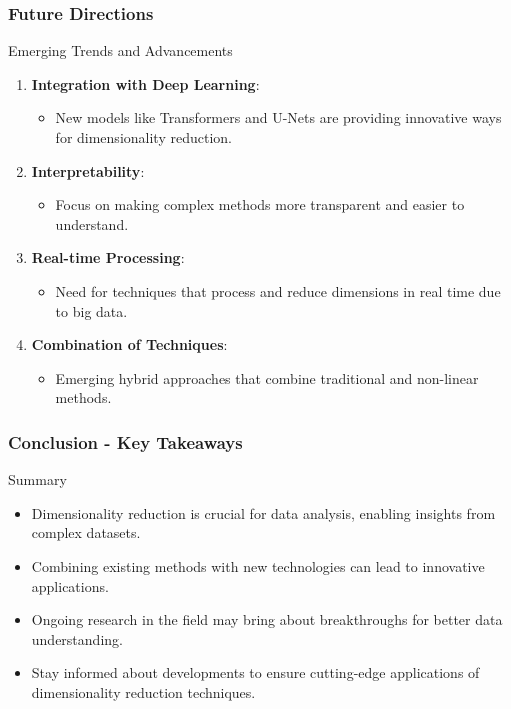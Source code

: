 \documentclass[aspectratio=169]{beamer}
\begin{document}
\begin{frame}[fragile]
    \frametitle{Future Directions}
    \begin{block}{Emerging Trends and Advancements}
        \begin{enumerate}
            \item \textbf{Integration with Deep Learning}:
                \begin{itemize}
                    \item New models like Transformers and U-Nets are providing innovative ways for dimensionality reduction.
                \end{itemize}
            \item \textbf{Interpretability}:
                \begin{itemize}
                    \item Focus on making complex methods more transparent and easier to understand.
                \end{itemize}
            \item \textbf{Real-time Processing}:
                \begin{itemize}
                    \item Need for techniques that process and reduce dimensions in real time due to big data.
                \end{itemize}
            \item \textbf{Combination of Techniques}:
                \begin{itemize}
                    \item Emerging hybrid approaches that combine traditional and non-linear methods.
                \end{itemize}
        \end{enumerate}
    \end{block}
\end{frame}

\begin{frame}[fragile]
    \frametitle{Conclusion - Key Takeaways}
    \begin{block}{Summary}
        \begin{itemize}
            \item Dimensionality reduction is crucial for data analysis, enabling insights from complex datasets.
            \item Combining existing methods with new technologies can lead to innovative applications.
            \item Ongoing research in the field may bring about breakthroughs for better data understanding.
        \end{itemize}
    \end{block}
    \begin{itemize}
        \item Stay informed about developments to ensure cutting-edge applications of dimensionality reduction techniques.
    \end{itemize}
\end{frame}
\end{document}

